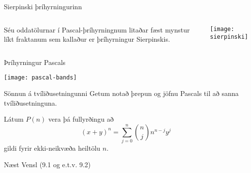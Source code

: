 \documentclass[handout]{beamer}
\begin{document}
\begin{frame}{Sierpinski þríhyrningurinn}
    \begin{columns}
        Séu oddatölurnar í Pascal-þríhyrningnum litaðar fæst mynstur líkt fraktanum sem kallaður er þríhyrningur Sierpinskis.
        \begin{center}
            \texttt{[image: sierpinski]}
        \end{center}    
    \end{columns}
\end{frame}
    
\begin{frame}{Þríhyrningur Pascals}
    \begin{center}
        \texttt{[image: pascal-bands]}
    \end{center}
\end{frame}

\begin{frame}{Sönnun á tvíliðusetningunni}
    Getum notað þrepun og jöfnu Pascals til að sanna tvíliðusetninguna.

    \vspace{1cm}
    Látum $P(n)$ vera þá fullyrðingu að \[(x + y)^n = \sum_{j=0}^n \binom{n}{j} n^{n-j} y^j\] gildi fyrir ekki-neikvæða heiltölu $n$.
\end{frame}

\begin{frame}{Næst}
Vensl (9.1 og e.t.v. 9.2)
\end{frame}
\end{document}
